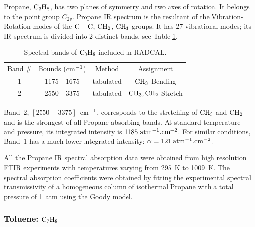   Propane, $\rm C_3H_8$, has two planes of symmetry and two axes of rotation. 
  It belongs to the point group $C_{2v}$. Propane IR spectrum
  is the resultant of the Vibration-Rotation modes of
  the $\rm C-C$, $\rm CH_2$, $\rm CH_3$ groups.
  It has 27 vibrational modes; its IR spectrum is divided into 2 distinct bands,
  see Table \ref{Table::C3H8}.
  \begin{table}[h p] 
   \centering 
   \caption{Spectral bands of $\rm C_3H_8$ included in RADCAL.}
   \vspace{0.1in}
   \label{Table::C3H8}
   \begin{tabular}{|c|r@{-}l|c|c|} 
    \hline
    Band \# & \multicolumn{2}{|l|}{Bounds (cm$\rm ^{-1}$) } & Method & Assignment \\
    \cline{1-5}  
    1 & 1175 & 1675 & tabulated &  $\rm CH_3$ Bending\\
    2 & 2550 & 3375 & tabulated &  $\rm CH_3, CH_2$ Stretch\\
    \hline
   \end{tabular} 
  \end{table}
  Band~2, $\left[2550-3375\right]$~cm$\rm ^{-1}$, corresponds to the 
  stretching of $\rm CH_3$ and $\rm CH_2$ and is the strongest of all Propane absorbing bands.
  At standard temperature and pressure, its integrated intensity is $1185\;\rm {atm^{-1}.cm^{-2}}$.
  For similar conditions, Band~1 has a much lower integrated intensity:
  $\alpha = 121\;\rm {atm^{-1}.cm^{-2}}$.
  
  All the Propane IR spectral absorption data were obtained from high resolution
  FTIR experiments with temperatures varying from 295~K to 1009~K.
  The spectral absorption coefficients were obtained by fitting the experimental
  spectral transmissivity of a homogeneous column of isothermal Propane
  with a total pressure of 1~atm using the Goody model. 

\subsubsection{Toluene: $\rm C_7H_8$}

